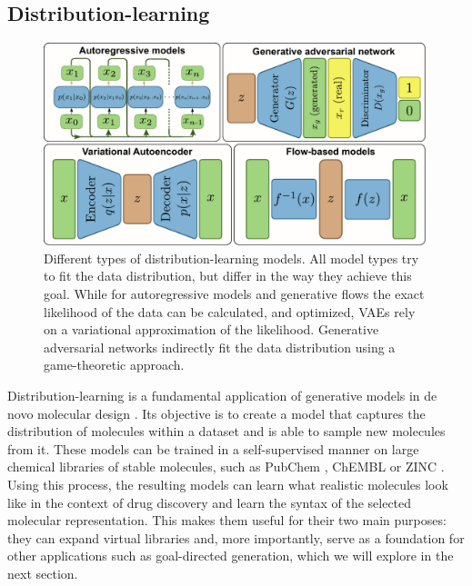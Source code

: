 \subsection{Distribution-learning}
\begin{figure}
	\centering
	\includegraphics[width=0.99\textwidth]{figures/distribution-learning-models.pdf}
	\caption{Different types of distribution-learning models. All model types
		try to fit the data distribution, but differ in the way they achieve this goal.
		While for autoregressive models and generative flows the exact likelihood of the data can be calculated,
		and optimized, VAEs rely on a variational approximation of the likelihood. Generative adversarial networks
		indirectly fit the data distribution using a game-theoretic approach. \label{fig:distribution-learning-models}}
\end{figure}
Distribution-learning is a fundamental application of generative models in de novo molecular design
\citep{seglerGeneratingFocusedMolecule2018,gomez-bombarelliAutomaticChemicalDesign2018,brownGuacaMolBenchmarkingModels2019}.
Its objective is to create a model that captures the distribution of molecules within a dataset and is able to sample
new molecules from it. These models can be trained in a self-supervised manner on large chemical libraries of stable
molecules, such as PubChem \citep{kimPubChemSubstanceCompound2016}, ChEMBL \citep{bentoChEMBLBioactivityDatabase2014} or
ZINC \citep{irwinZINCFreeTool2012}. Using this process, the resulting models can learn what realistic molecules look
like in the context of drug discovery and learn the syntax of the selected molecular representation. This makes them
useful for their two main purposes: they can expand virtual libraries and, more importantly, serve as a foundation for
other applications such as goal-directed generation, which we will explore in the next section.

